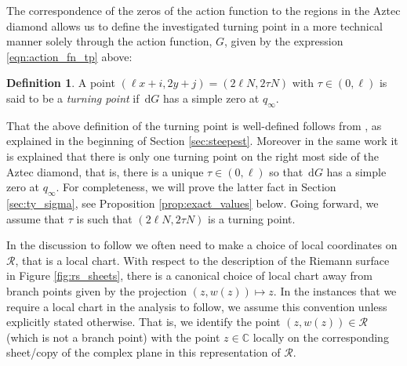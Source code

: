 \documentclass[11pt]{article}
\theoremstyle{plain}
\theoremstyle{definition}
\newtheorem{definition}[theorem]{Definition}
\numberwithin{equation}{section}
\renewcommand{\d}{\,\mathrm{d}}
\begin{document}
The correspondence of the zeros of the action function to the regions in the Aztec diamond allows us to define the investigated turning point in a more technical manner solely through the action function, $G$, given by the expression \eqref{eqn:action_fn_tp} above:
%
\begin{definition}\label{def:turning_point}
A point $(\ell x+i,2y+j)=(2\ell N,2\tau N)$ with $\tau \in (0,\ell)$ is said to be a \emph{turning point} if $\d G$ has a simple zero at $q_\infty$. 
\end{definition}
That the above definition of the turning point is well-defined follows from \cite{Ber21}, as explained in the beginning of Section \ref{sec:steepest}. Moreover in the same work it is explained that there is only one turning point on the right most side of the Aztec diamond, that is, there is a unique $\tau \in (0,\ell)$ so that $\d G$ has a simple zero at $q_\infty$. For completeness, we will prove the latter fact in Section \ref{sec:ty_sigma}, see Proposition \ref{prop:exact_values} below. Going forward, we assume that $\tau $ is such that $(2\ell N,2\tau N)$ is a turning point. 

In the discussion to follow we often need to make a choice of local coordinates on $\mathcal{R}$, that is a local chart. With respect to the description of the Riemann surface in Figure \ref{fig:rs_sheets}, there is a canonical choice of local chart away from branch points given by the projection $(z, w(z))\mapsto z$. 
In the instances that we require a local chart in the analysis to follow, we assume this convention unless explicitly stated otherwise.
That is, we identify the point $(z, w(z))\in\mathcal{R}$ (which is not a branch point) with the point $z\in\mathbb{C}$ locally on the corresponding sheet/copy of the complex plane in this representation of $\mathcal{R}$.
\end{document}
